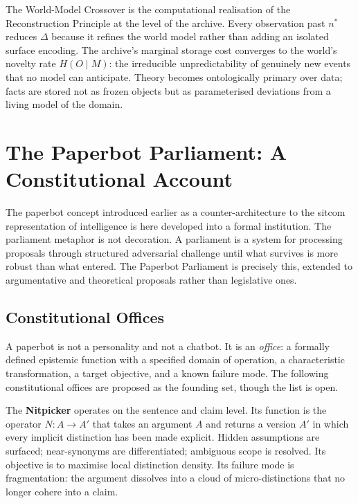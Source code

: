 \documentclass[12pt, letterpaper]{article}
\theoremstyle{remark}
\begin{document}
The World-Model Crossover is the computational realisation of the
Reconstruction Principle at the level of the archive.  Every observation
past $n^*$ reduces $\Delta$ because it refines the world model rather than
adding an isolated surface encoding.  The archive's marginal storage cost
converges to the world's novelty rate $H(O \mid M)$: the irreducible
unpredictability of genuinely new events that no model can anticipate.
Theory becomes ontologically primary over data; facts are stored not as
frozen objects but as parameterised deviations from a living model of the
domain.

\section{The Paperbot Parliament: A Constitutional Account}

The paperbot concept introduced earlier as a counter-architecture to the
sitcom representation of intelligence is here developed into a formal
institution.  The parliament metaphor is not decoration.  A parliament is
a system for processing proposals through structured adversarial challenge
until what survives is more robust than what entered.  The Paperbot Parliament
is precisely this, extended to argumentative and theoretical proposals rather
than legislative ones.

\subsection{Constitutional Offices}

A paperbot is not a personality and not a chatbot.  It is an \emph{office}:
a formally defined epistemic function with a specified domain of operation, a
characteristic transformation, a target objective, and a known failure mode.
The following constitutional offices are proposed as the founding set, though
the list is open.

The \textbf{Nitpicker} operates on the sentence and claim level.  Its
function is the operator $N: A \to A'$ that takes an argument $A$ and returns
a version $A'$ in which every implicit distinction has been made explicit.
Hidden assumptions are surfaced; near-synonyms are differentiated; ambiguous
scope is resolved.  Its objective is to maximise local distinction density.
Its failure mode is fragmentation: the argument dissolves into a cloud of
micro-distinctions that no longer cohere into a claim.
\end{document}
